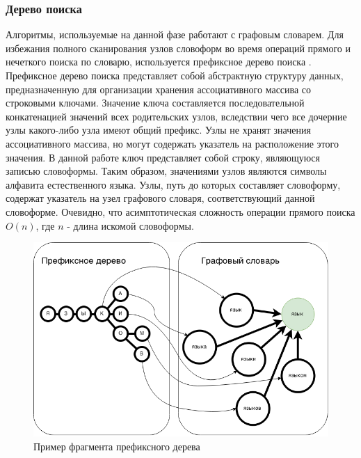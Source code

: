 \subsubsection{Дерево поиска}
Алгоритмы, используемые на данной фазе работают с графовым словарем. Для избежания полного сканирования узлов словоформ во время операций прямого и нечеткого поиска по словарю, используется префиксное дерево поиска \cite{knuth}. Префиксное дерево поиска представляет собой абстрактную структуру данных, предназначенную для организации хранения ассоциативного массива со строковыми ключами. Значение ключа составляется последовательной конкатенацией значений всех родительских узлов, вследствии чего все дочерние узлы какого-либо узла имеют общий префикс. Узлы не хранят значения ассоциативного массива, но могут содержать указатель на расположение этого значения. В данной работе ключ представляет собой строку, являющуюся записью словоформы. Таким образом, значениями узлов являются символы алфавита естественного языка. Узлы, путь до которых составляет словоформу, содержат указатель на узел графового словаря, соответствующий данной словоформе. Очевидно, что асимптотическая сложность операции прямого поиска \(O(n)\), где \(n\) - длина искомой словоформы.
\begin{figure}[H]
	\centering
	\includegraphics[scale=0.6]{img/prefixtree.png}
	\caption{Пример фрагмента префиксного дерева}
\end{figure}

